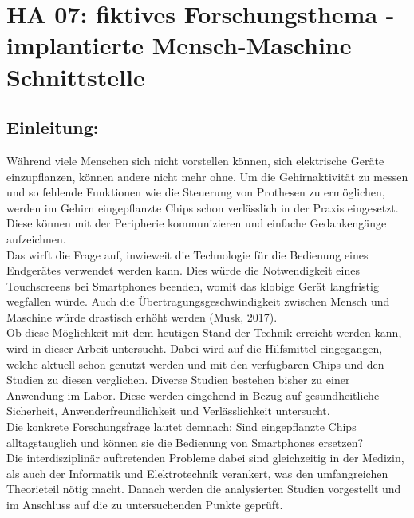 \section{HA 07: fiktives Forschungsthema - implantierte Mensch-Maschine Schnittstelle}
\subsection{Einleitung:}
  Während viele Menschen sich nicht vorstellen können, sich elektrische Geräte einzupflanzen, können andere nicht mehr ohne. Um die Gehirnaktivität zu messen und so fehlende Funktionen wie die Steuerung von Prothesen zu ermöglichen, werden im Gehirn eingepflanzte Chips schon verlässlich in der Praxis eingesetzt. Diese können mit der Peripherie kommunizieren und einfache Gedankengänge aufzeichnen.\\
  Das wirft die Frage auf, inwieweit die Technologie für die Bedienung eines Endgerätes verwendet werden kann. Dies würde die Notwendigkeit eines Touchscreens bei Smartphones beenden, womit das klobige Gerät langfristig wegfallen würde. Auch die Übertragungsgeschwindigkeit zwischen Mensch und Maschine würde drastisch erhöht werden (Musk, 2017). \\
  Ob diese Möglichkeit mit dem heutigen Stand der Technik erreicht werden kann, wird in dieser Arbeit untersucht. Dabei wird auf die Hilfsmittel eingegangen, welche aktuell schon genutzt werden und mit den verfügbaren Chips und den Studien zu diesen verglichen. Diverse Studien bestehen bisher zu einer Anwendung im Labor. Diese werden eingehend in Bezug auf gesundheitliche Sicherheit, Anwenderfreundlichkeit und Verlässlichkeit untersucht.\\
  Die konkrete Forschungsfrage lautet demnach:
  Sind eingepflanzte Chips alltagstauglich und können sie die Bedienung von Smartphones ersetzen?\\
  Die interdisziplinär auftretenden Probleme dabei sind gleichzeitig in der Medizin, als auch der Informatik und Elektrotechnik verankert, was den umfangreichen Theorieteil nötig macht. Danach werden die analysierten Studien vorgestellt und im Anschluss auf die zu untersuchenden Punkte geprüft.
